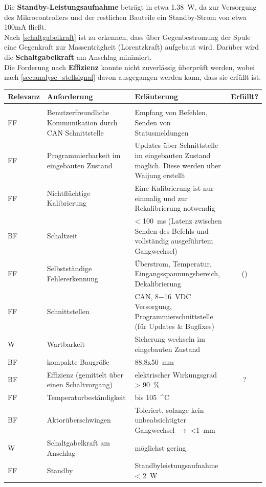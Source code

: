 Die \textbf{Standby-Leistungsaufnahme} beträgt in etwa \SI{1,38}{W}, da zur Versorgung des Mikrocontrollers und der restlichen Bauteile ein Standby-Strom von etwa 100mA fließt.\\
Nach \autoref{schaltgabelkraft} ist zu erkennen, dass über Gegenbestromung der Spule eine Gegenkraft zur Massenträgheit (Lorentzkraft) aufgebaut wird. Darüber wird die \textbf{Schaltgabelkraft} am Anschlag minimiert.\\
Die Forderung nach \textbf{Effizienz} konnte nicht zuverlässig überprüft werden, wobei nach \autoref{sec:analyse_stellsignal} davon ausgegangen werden kann, dass sie erfüllt ist.
\begin{table}[h]
	\centering
		\begin{tabular}{l|p{5cm}|p{7cm}|c}
			\textbf{Relevanz} & \textbf{Anforderung} & \textbf{Erläuterung} & Erfüllt?\\ \hline
			& &\\
			FF & Benutzerfreundliche Kommunikation durch CAN Schnittstelle & Empfang von Befehlen, Senden von Statusmeldungen & \checkmark\\ \hline
			FF & Programmierbarkeit im eingebauten Zustand & Updates über Schnittstelle im eingebauten Zustand möglich. Diese werden über Waijung erstellt & \checkmark \\ \hline
			FF & Nichtflüchtige Kalibrierung & Eine Kalibrierung ist nur einmalig und zur Rekalibrierung notwendig& \checkmark\\ \hline
			BF & Schaltzeit & < \SI{100}{ms} (Latenz zwischen Senden des Befehls und vollständig ausgeführtem Gangwechsel)& \checkmark\\ \hline
			FF & Selbstständige Fehlererkennung & Überstrom, Temperatur, Eingangsspannungsbereich, Dekalibrierung& (\checkmark) \\ \hline
			FF & Schnittstellen & CAN, \SI{8-16}{VDC} Versorgung, Programmierschnittstelle (für Updates \& Bugfixes)& \checkmark \\ \hline
			W & Wartbarkeit & Sicherung wechseln im eingebauten Zustand& \checkmark\\ \hline
			BF & kompakte Baugröße & 88,8x\SI{50}{mm}&\checkmark \\ \hline
			BF & Effizienz (gemittelt über einen Schaltvorgang) & elektrischer Wirkungsgrad > \SI{90}{\%} & ?\\ \hline
			FF & Temperaturbeständigkeit & bis \SI{105}{^\circ C}& \checkmark \\ \hline
			BF & Aktorüberschwingen & Toleriert, solange kein unbeabsichtigter Gangwechsel $\rightarrow$ \SI{<1}{mm}& \checkmark
			\\ \hline
			W & Schaltgabelkraft am Anschlag & möglichst gering& \checkmark \\ \hline
			FF & Standby & Standbyleistungsaufnahme < \SI{2}{W}& \checkmark \\ \hline
		\end{tabular}
	\label{tab:Anforderungsliste2}
\end{table}

